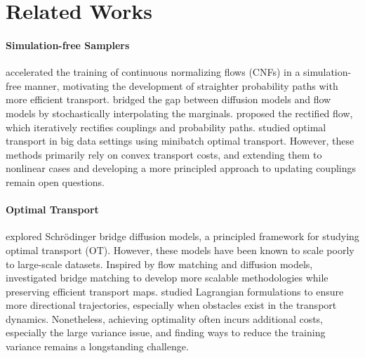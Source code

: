 \section{Related Works}
\paragraph{Simulation-free Samplers} \cite{flow_matching} accelerated the training of continuous normalizing flows (CNFs) in a simulation-free manner, motivating the development of straighter probability paths with more efficient transport. \citet{Albergo_stochastic_interpolants, Albergo_unified_framework} bridged the gap between diffusion models and flow models by stochastically interpolating the marginals. \cite{Rectified, Rectified_group} proposed the rectified flow, which iteratively rectifies couplings and probability paths. \citet{Multisample_flow_matching,CFM_Tong} studied optimal transport in big data settings using minibatch optimal transport. However, these methods primarily rely on convex transport costs, and extending them to nonlinear cases and developing a more principled approach to updating couplings remain open questions.

\paragraph{Optimal Transport} \citet{DSB, SBP_max_llk, forward_backward_SDE, mSB} explored Schrödinger bridge diffusion models, a principled framework for studying optimal transport (OT). However, these models have been known to scale poorly to large-scale datasets. Inspired by flow matching and diffusion models, \cite{SB_matching, gSBM} investigated bridge matching to develop more scalable methodologies while preserving efficient transport maps. \cite{NLSB, NOT_LC} studied Lagrangian formulations to ensure more directional trajectories, especially when obstacles exist in the transport dynamics. Nonetheless, achieving optimality often incurs additional costs, especially the large variance issue, and finding ways to  reduce the training variance remains a longstanding challenge.
